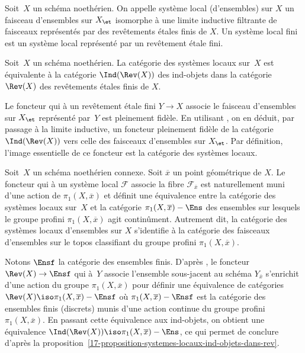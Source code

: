\documentclass[10pt]{../fichiers-configuration-latex/smfart}
\begin{document}
\begin{definition2}
Soit $X$ un schéma noethérien. On appelle système local (d'ensembles)
sur $X$
un faisceau d'ensembles sur $X_\et$ isomorphe à une limite inductive
filtrante de faisceaux représentés par des revêtements étales finis de $X$.
Un système local fini est un système local représenté par un revêtement
étale fini.
\end{definition2}

\begin{proposition2}\label{17-proposition-systemes-locaux-ind-objets-dans-rev}
Soit $X$ un schéma noethérien. La catégorie des systèmes locaux sur $X$ est
équivalente à la catégorie $\Ind(\Rev(X))$ des ind-objets dans la catégorie
$\Rev(X)$ des revêtements étales finis de $X$.
\end{proposition2}

Le foncteur qui à un revêtement étale fini $Y\to X$ associe le faisceau
d'ensembles sur $X_\et$ représenté par $Y$ est pleinement fidèle. En
utilisant , on en déduit, par passage à la limite
inductive, un foncteur pleinement fidèle de la catégorie $\Ind(\Rev(X))$
vers celle des faisceaux d'ensembles sur $X_\et$. Par définition, l'image
essentielle de ce foncteur est la catégorie des systèmes locaux.

\begin{proposition2}
Soit $X$ un schéma noethérien connexe. Soit $\overline x$ un point
géométrique de $X$. Le foncteur qui à un système local $\mathscr F$ associe
la fibre ${\mathscr F}_{\overline x}$ est naturellement muni d'une action
de $\pi_1(X,\overline x)$ et définit une équivalence entre la
catégorie des systèmes locaux sur $X$ et
la catégorie $\pi_1(X,\overline x)-\Ens$ des ensembles sur lesquels le
groupe profini $\pi_1(X,\overline x)$ agit continûment.
Autrement dit, la catégorie des
systèmes locaux d'ensembles sur $X$
s'identifie à la catégorie des faisceaux
d'ensembles sur le topos classifiant du
groupe profini $\pi_1(X,\overline x)$.
\end{proposition2}

Notons $\Ensf$ la catégorie des ensembles finis.
D'après , le foncteur $\Rev(X)\to \Ensf$ qui à $Y$ associe
l'ensemble sous-jacent au schéma $Y_{\overline x}$ s'enrichit d'une action
du groupe $\pi_1(X,\overline x)$ pour définir une équivalence de catégories 
$\Rev(X)\iso \pi_1(X,\overline x)-\Ensf$ où $\pi_1(X,\overline x)-\Ensf$
est la catégorie des ensembles finis (discrets) munis d'une action continue
du groupe profini $\pi_1(X,\overline x)$. En passant cette équivalence aux
ind-objets, on obtient une équivalence $\Ind(\Rev(X))\iso
\pi_1(X,\overline x)-\Ens$, ce qui permet de conclure d'après la
proposition~\ref{17-proposition-systemes-locaux-ind-objets-dans-rev}.
\end{document}
